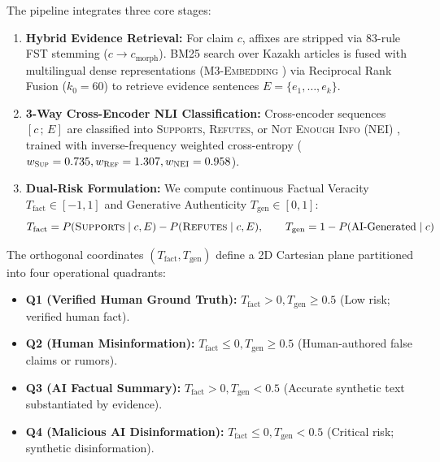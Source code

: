 The pipeline integrates three core stages:
\begin{enumerate}[leftmargin=*, label=(\alph*), nosep]
    \item \textbf{Hybrid Evidence Retrieval:} For claim $c$, affixes are stripped via 83-rule FST stemming ($c \to c_{\text{morph}}$). BM25 search \cite{robertson2009bm25} over Kazakh articles is fused with multilingual dense representations (\textsc{M3-Embedding} \cite{chen-etal-2024-m3}) via Reciprocal Rank Fusion ($k_0 = 60$) \cite{cormack2009rrf} to retrieve evidence sentences $E = \{e_1, \dots, e_k\}$.
    \item \textbf{3-Way Cross-Encoder NLI Classification:} Cross-encoder sequences $[c \,;\, E]$ are classified into \textsc{Supports}, \textsc{Refutes}, or \textsc{Not Enough Info} (NEI) \cite{thorne2018fever}, trained with inverse-frequency weighted cross-entropy ($w_{\textsc{Sup}} = 0.735, w_{\textsc{Ref}} = 1.307, w_{\textsc{NEI}} = 0.958$).
    \item \textbf{Dual-Risk Formulation:} We compute continuous Factual Veracity $T_{\text{fact}} \in [-1, 1]$ and Generative Authenticity $T_{\text{gen}} \in [0, 1]$:
    \begin{equation}
        T_{\text{fact}} = P(\textsc{Supports} \mid c, E) - P(\textsc{Refutes} \mid c, E), \qquad T_{\text{gen}} = 1 - P(\text{AI-Generated} \mid c)
    \end{equation}
\end{enumerate}
The orthogonal coordinates $(T_{\text{fact}}, T_{\text{gen}})$ define a 2D Cartesian plane partitioned into four operational quadrants:
\begin{itemize}[leftmargin=*, nosep]
    \item \textbf{Q1 (Verified Human Ground Truth):} $T_{\text{fact}} > 0, T_{\text{gen}} \ge 0.5$ (Low risk; verified human fact).
    \item \textbf{Q2 (Human Misinformation):} $T_{\text{fact}} \le 0, T_{\text{gen}} \ge 0.5$ (Human-authored false claims or rumors).
    \item \textbf{Q3 (AI Factual Summary):} $T_{\text{fact}} > 0, T_{\text{gen}} < 0.5$ (Accurate synthetic text substantiated by evidence).
    \item \textbf{Q4 (Malicious AI Disinformation):} $T_{\text{fact}} \le 0, T_{\text{gen}} < 0.5$ (Critical risk; synthetic disinformation).
\end{itemize}
